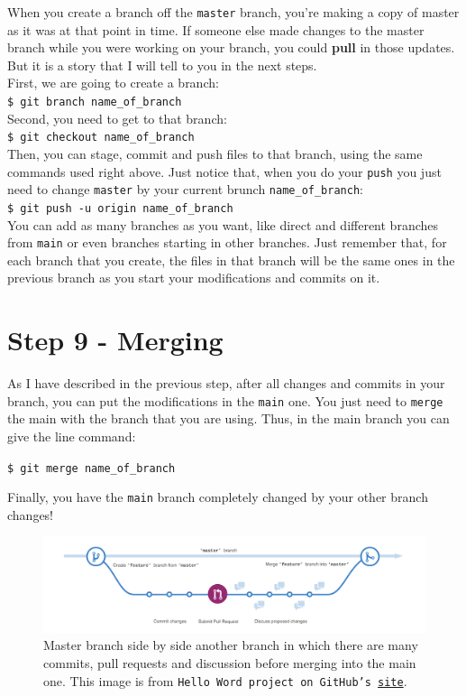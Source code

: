 \documentclass[12pt,a4paper,titlepage,brazil]{article}
\begin{document}
{When you create a branch off the \texttt{master} branch, you’re making a copy of master as it was at that point in time. If someone else made changes to the master branch while you were working on your branch, you could {\bf pull} in those updates. But it is a story that I will tell to you in the next steps.\\

First, we are going to create a branch:\\

\texttt{\$ git branch name\_of\_branch}\\

Second, you need to get to that branch:\\

\texttt{\$ git checkout name\_of\_branch}\\

Then, you can stage, commit and push files to that branch, using the same commands used right above. Just notice that, when you do your \texttt{push} you just need to change \texttt{master} by your current brunch \texttt{name\_of\_branch}:\\

\texttt{\$ git push -u origin name\_of\_branch}\\

You can add as many branches as you want, like direct and different branches from \texttt{main} or even branches starting in other branches. Just remember that, for each branch that you create, the files in that branch will be the same ones in the previous branch as you start your modifications and commits on it.


\section{Step 9 - Merging}

As I have described in the previous step, after all changes and commits in your branch, you can put the modifications in the \texttt{main} one. You just need to \texttt{merge} the main with the branch that you are using. Thus, in the main branch you can give the line command:

\texttt{\$ git merge name\_of\_branch}

Finally, you have the \texttt{main} branch completely changed by your other branch changes!

\begin{figure}[h!]
 \centering 
 \includegraphics[scale=0.24]{branching.png}
 \caption{Master branch side by side another branch in which there are many commits, pull requests and discussion before merging into the main one. This image is from \texttt{Hello Word project on GitHub's \href{https://guides.github.com/activities/hello-world/branching.png}{site}}.}
\end{figure}

}
\end{document}
